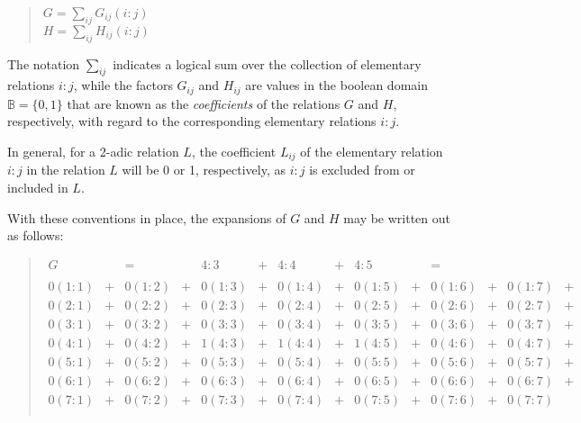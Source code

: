 \documentclass[12pt]{article}
\begin{document}
\begin{quote}
$G = \sum_{ij} G_{ij}(i:j)$
\\
$H = \sum_{ij} H_{ij}(i:j)$
\end{quote}

The notation $\sum_{ij}$ indicates a logical sum over the collection of elementary relations $i:j$, while the factors $G_{ij}$ and $H_{ij}$ are values in the boolean domain $\mathbb{B} = \{ 0, 1 \}$ that are known as the \textit{coefficients} of the relations $G$ and $H$, respectively, with regard to the corresponding elementary relations $i:j$.

In general, for a 2-adic relation $L$, the coefficient $L_{ij}$ of the elementary relation $i:j$ in the relation $L$ will be 0 or 1, respectively, as $i:j$ is excluded from or included in $L$.

With these conventions in place, the expansions of $G$ and $H$ may be written out as follows:

\begin{quote}$\begin{array}{cccccccccccccccc}
G & & = & & 4:3 & + & 4:4 & + & 4:5 & & = \\
\\
0(1\mathrm{:}1) & + & 0(1\mathrm{:}2) & + & 0(1\mathrm{:}3) & + & 0(1\mathrm{:}4) & + & 0(1\mathrm{:}5) & + & 0(1\mathrm{:}6) & + & 0(1\mathrm{:}7) & + \\
0(2\mathrm{:}1) & + & 0(2\mathrm{:}2) & + & 0(2\mathrm{:}3) & + & 0(2\mathrm{:}4) & + & 0(2\mathrm{:}5) & + & 0(2\mathrm{:}6) & + & 0(2\mathrm{:}7) & + \\
0(3\mathrm{:}1) & + & 0(3\mathrm{:}2) & + & 0(3\mathrm{:}3) & + & 0(3\mathrm{:}4) & + & 0(3\mathrm{:}5) & + & 0(3\mathrm{:}6) & + & 0(3\mathrm{:}7) & + \\
0(4\mathrm{:}1) & + & 0(4\mathrm{:}2) & + & 1(4\mathrm{:}3) & + & 1(4\mathrm{:}4) & + & 1(4\mathrm{:}5) & + & 0(4\mathrm{:}6) & + & 0(4\mathrm{:}7) & + \\
0(5\mathrm{:}1) & + & 0(5\mathrm{:}2) & + & 0(5\mathrm{:}3) & + & 0(5\mathrm{:}4) & + & 0(5\mathrm{:}5) & + & 0(5\mathrm{:}6) & + & 0(5\mathrm{:}7) & + \\
0(6\mathrm{:}1) & + & 0(6\mathrm{:}2) & + & 0(6\mathrm{:}3) & + & 0(6\mathrm{:}4) & + & 0(6\mathrm{:}5) & + & 0(6\mathrm{:}6) & + & 0(6\mathrm{:}7) & + \\
0(7\mathrm{:}1) & + & 0(7\mathrm{:}2) & + & 0(7\mathrm{:}3) & + & 0(7\mathrm{:}4) & + & 0(7\mathrm{:}5) & + & 0(7\mathrm{:}6) & + & 0(7\mathrm{:}7) &   \\
\end{array}$\end{quote}
\end{document}
